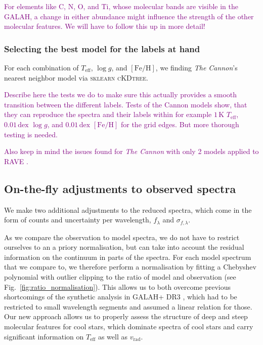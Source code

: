 \documentclass[
  journal=pasa,
  manuscript=research-paper, %
  year=2021,
  volume=37,
]{cup-journal}
\newcommand{\SB}[1]{{\textcolor{purple}{#1}}}
\newcommand{\Teff}{$T_\mathrm{eff}$\xspace}
\newcommand{\logg}{$\log g$\xspace}
\newcommand{\feh}{$\mathrm{[Fe/H]}$\xspace}
\newcommand{\vrad}{$v_\mathrm{rad}$\xspace}
\newcommand{\TheCannon}{\textit{The Cannon}\xspace}
\newcommand{\TLF}{\Teff, \logg, and \feh}
\newcommand{\dex}{\,\mathrm{dex}}	%
\newcommand{\K}{\,\mathrm{K}}	%
\begin{document}


\SB{For elements like C, N, O, and Ti, whose molecular bands are visible in the GALAH, a change in either abundance might influence the strength of the other molecular features. We will have to follow this up in more detail!}



\subsubsection{Selecting the best model for the labels at hand}

For each combination of \TLF, we finding \TheCannon's nearest neighbor model via \textsc{sklearn} \textsc{cKDtree}.

\SB{Describe here the tests we do to make sure this actually provides a smooth transition between the different labels. Tests of the Cannon models show, that they can reproduce the spectra and their labels within for example $1\K$ \Teff, $0.01\dex$ \logg, and $0.01\dex$ \feh for the grid edges. But more thorough testing is needed.}

\SB{Also keep in mind the issues found for \TheCannon with only 2 models applied to RAVE \citep{Casey2017}.}

\subsection{On-the-fly adjustments to observed spectra} \label{subsec:adjustments_observation}

We make two additional adjustments to the reduced spectra, which come in the form of counts and uncertainty per wavelength, $f_\lambda$ and $\sigma_{f,\lambda}$.

As we compare the observation to model spectra, we do not have to restrict ourselves to an a priory normalisation, but can take into account the residual information on the continuum in parts of the spectra. For each model spectrum that we compare to, we therefore perform a normalisation by fitting a Chebyshev polynomial with outlier clipping to the ratio of model and observation (see Fig.~\ref{fig:ratio_normalisation}). This allows us to both overcome previous shortcomings of the synthetic analysis in GALAH+ DR3 \citep{Buder2021}, which had to be restricted to small wavelength segments and assumed a linear relation for those. Our new approach allows us to properly assess the structure of deep and steep molecular features for cool stars, which dominate spectra of cool stars and carry significant information on \Teff as well as \vrad.
\end{document}
